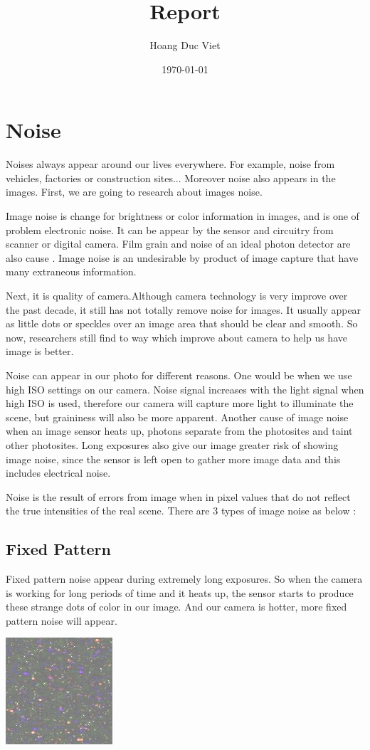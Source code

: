 \documentclass[10pt]{article}
\begin{document}
		\title{Report}
		\author{Hoang Duc Viet}
		\date{\today}
		\maketitle

\newpage
\newpage
\section{Noise}
Noises always appear around our lives everywhere. For example, noise from vehicles, factories or construction sites... Moreover noise also appears in the images. First, we are going to research about images noise.

Image noise is change for brightness or color information in images, and is one of problem electronic noise. It can be appear by the sensor and circuitry from scanner or digital camera.  Film grain and noise of an ideal photon detector are also cause . Image noise is an undesirable by product of image capture that have many extraneous information.

Next, it is quality of camera.Although camera technology is very improve over the past decade, it still has not totally remove noise for images. It usually appear as little dots or speckles over an image area that should be clear and smooth. So now, researchers still find to way which improve about camera to help us have image is better.   


Noise can appear in our photo for different reasons. One would be when we use high ISO settings on our camera. Noise signal increases with the light signal when high ISO is used, therefore our camera will capture more light to illuminate the scene, but graininess will also be more apparent. Another cause of image noise when an image sensor heats up, photons separate from the photosites and taint other photosites. Long exposures also give our image greater risk of showing image noise, since the sensor is left open to gather more image data and this includes electrical noise.

Noise is the result of errors from image when in pixel values that do not reflect the true intensities of the real scene. There are 3 types of image noise as below :

\subsection{Fixed Pattern}
Fixed pattern noise appear during extremely long exposures. So when the camera is working for long periods of time and it heats up, the sensor starts to produce these strange dots of color in our image. And our camera is hotter, more fixed pattern noise will appear.
\begin{center}
	\includegraphics{fix.png}
\end{center}
\end{document}
